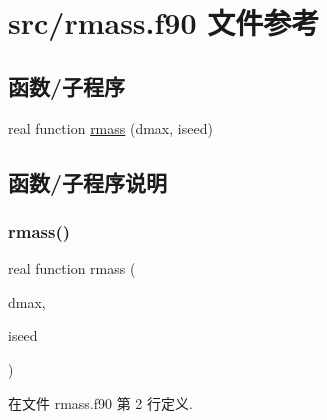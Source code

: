 \hypertarget{rmass_8f90}{}\section{src/rmass.f90 文件参考}
\label{rmass_8f90}
\subsection*{函数/子程序}
\begin{DoxyCompactItemize}
\item 
real function \mbox{\hyperlink{rmass_8f90_a4e026f5a99eb3a89d08ad6c8064a8a61}{rmass}} (dmax, iseed)
\end{DoxyCompactItemize}


\subsection{函数/子程序说明}
\mbox{\label{rmass_8f90_a4e026f5a99eb3a89d08ad6c8064a8a61}} 
\subsubsection{\texorpdfstring{rmass()}{rmass()}}
{\footnotesize\ttfamily real function rmass (\begin{DoxyParamCaption}\item[{}]{dmax,  }\item[{}]{iseed }\end{DoxyParamCaption})}



在文件 rmass.\+f90 第 2 行定义.

